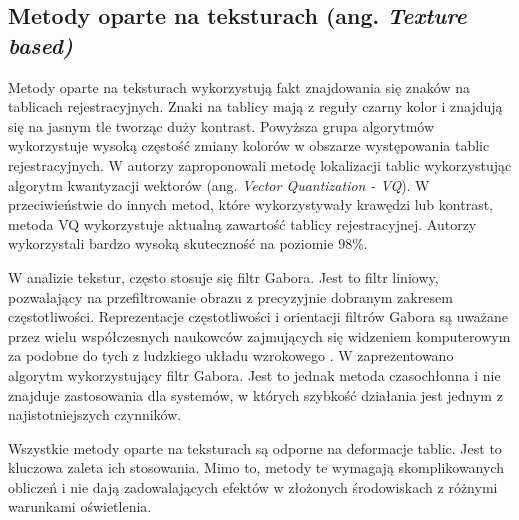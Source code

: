 \subsection{Metody oparte na teksturach (ang. \textit{Texture based)}}
Metody oparte na teksturach wykorzystują fakt znajdowania się znaków na tablicach rejestracyjnych.
Znaki na tablicy mają z reguły czarny kolor i znajdują się na jasnym tle tworząc duży kontrast.
Powyższa grupa algorytmów wykorzystuje wysoką częstość zmiany kolorów w obszarze występowania tablic rejestracyjnych.
W \cite{824138} autorzy zaproponowali metodę lokalizacji tablic wykorzystując algorytm kwantyzacji wektorów (ang. \textit{Vector Quantization - VQ}).
W przeciwieństwie do innych metod, które wykorzystywały krawędzi lub kontrast, metoda VQ wykorzystuje aktualną zawartość tablicy rejestracyjnej.
Autorzy wykorzystali bardzo wysoką skuteczność na poziomie 98\%.

W analizie tekstur, często stosuje się filtr Gabora.
Jest to filtr liniowy, pozwalający na przefiltrowanie obrazu z precyzyjnie dobranym zakresem częstotliwości.
Reprezentacje częstotliwości i orientacji filtrów Gabora są uważane przez wielu współczesnych naukowców zajmujących się widzeniem komputerowym za podobne do tych z ludzkiego układu wzrokowego \cite{gabor_human_eye}.
W \cite{gabor_lpr} zaprezentowano algorytm wykorzystujący filtr Gabora.
Jest to jednak metoda czasochłonna i nie znajduje zastosowania dla systemów, w których szybkość działania jest jednym z najistotniejszych czynników.

Wszystkie metody oparte na teksturach są odporne na deformacje tablic.
Jest to kluczowa zaleta ich stosowania.
Mimo to, metody te wymagają skomplikowanych obliczeń i nie dają zadowalających efektów w złożonych środowiskach z różnymi warunkami oświetlenia.


